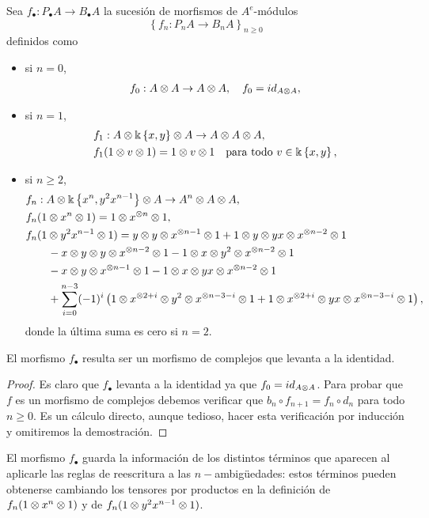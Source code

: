 \documentclass[fleqn,../tesis.tex]{subfiles}
\begin{document}
\begin{prop}
	Sea $f_{\bullet} : P_{\bullet}A \to B_{\bullet}A$ la sucesión de morfismos de $A^e$-módulos
	\[
		\left\lbrace f_{n} : P_{n}A \to B_{n}A \right\rbrace_{n \geq 0}
	\] definidos como
	\begin{itemize}
		\item si $n = 0$,
		\begin{align*}
			f_0 : A \otimes A \to A \otimes A, \quad f_0 = id_{A\otimes A},
		\end{align*}
		\item si $n = 1$,
		\begin{align*}
			&f_1 : A \otimes \Bbbk \left\lbrace x, y \right\rbrace \otimes A \to A \otimes A \otimes A,\\
			&f_1(1 \otimes v \otimes 1) = 1 \otimes v \otimes 1 \quad\text{para todo } v \in \Bbbk \left\lbrace x, y \right\rbrace,
		\end{align*}
		\item si $n \geq 2 $,
		\begin{align*}
			&f_n : A \otimes \Bbbk \left\lbrace x^{n}, y^2x^{n - 1} \right\rbrace \otimes A \to A^{n} \otimes A \otimes A,\\
			&f_n(1 \otimes x^{n} \otimes 1) = 1 \otimes x^{\otimes n} \otimes 1,\\
			&f_n(1 \otimes y^2x^{n - 1} \otimes 1) = y \otimes y \otimes x^{\otimes n - 1}\otimes 1 + 1 \otimes y \otimes yx \otimes x^{ \otimes n - 2}\otimes 1\\
			&\qquad - x \otimes y \otimes y \otimes x^{\otimes n - 2}\otimes 1 - 1 \otimes x \otimes y^{2}\otimes x^{\otimes n - 2} \otimes 1\\
			&\qquad -x \otimes y \otimes x^{\otimes n - 1} \otimes 1 - 1 \otimes x \otimes yx \otimes x^{\otimes n - 2} \otimes 1\\
			&\qquad + \sum_{i = 0}^{n - 3}(-1)^{i}\left(1\otimes x^{\otimes 2 + i} \otimes y^2 \otimes x^{\otimes n - 3 - i} \otimes 1
				+ 1 \otimes x^{\otimes 2 + i} \otimes yx \otimes x^{\otimes n - 3 - i} \otimes 1\right),
		\end{align*}
		donde la última suma es cero si $n = 2$.
	\end{itemize}
	El morfismo $f_{\bullet}$ resulta ser un morfismo de complejos que levanta a la identidad.
\end{prop}
\begin{proof}
	Es claro que $f_{\bullet}$ levanta a la identidad ya que $f_0 = id_{A \otimes A}$. Para probar que
	$f$ es un morfismo de complejos debemos verificar que $b_n \circ f_{n + 1} = f_n \circ d_n$ para todo
	$n \geq 0$. Es un cálculo directo, aunque tedioso, hacer esta verificación por inducción y omitiremos la demostración. 
\end{proof}
El morfismo $f_{\bullet}$ guarda la información de los distintos términos que aparecen al aplicarle las reglas
de reescritura a las $n-$ambigüedades: estos términos pueden obtenerse cambiando los tensores por productos
en la definición de $f_n(1 \otimes x^{n} \otimes 1)$ y de $f_n(1 \otimes y^2x^{n - 1} \otimes 1)$.
\end{document}
